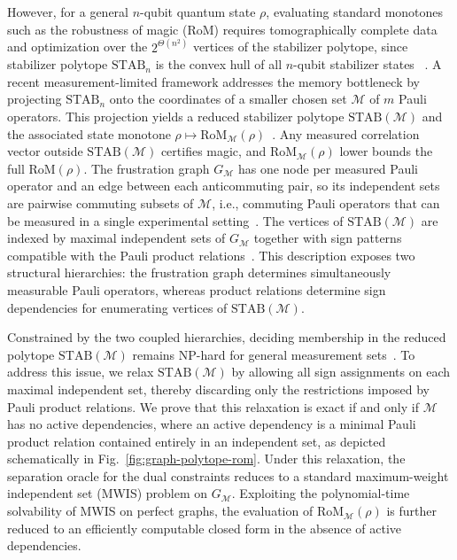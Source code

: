 \documentclass[10pt,aps,pra,twocolumn,floatfix,nofootinbib,superscriptaddress,longbibliography]{revtex4-2}
\newcommand{\Mcal}{\mathcal M}
\newcommand{\STAB}{\mathrm{STAB}}
\newcommand{\RoM}{\mathrm{RoM}}
\begin{document}
	However, for a general $n$-qubit quantum state $\rho$, evaluating standard monotones such as the robustness of magic (RoM) requires tomographically complete data and optimization over the $2^{\Theta(n^2)}$ vertices of the stabilizer polytope, since stabilizer polytope $\STAB_n$ is the convex hull of all $n$-qubit stabilizer states ~\cite{Veitch2014,garcia2017geometry,heinrich2019robustness,hamaguchi2024handbook,oliveirajunior2025geometric,leone2026unbearablehardnessdecidingmagic}.
	A recent measurement-limited framework addresses the memory bottleneck by projecting $\STAB_n$ onto the coordinates of a smaller chosen set $\Mcal$ of $m$ Pauli operators.
	This projection yields a reduced stabilizer polytope $\STAB(\Mcal)$ and the associated state monotone $\rho\mapsto\RoM_\Mcal(\rho)$~\cite{varela2026predictingmagicmeasurements}.
	Any measured correlation vector outside $\STAB(\Mcal)$ certifies magic, and $\RoM_\Mcal(\rho)$ lower bounds the full $\RoM(\rho)$.
	The frustration graph $G_\Mcal$ has one node per measured Pauli operator and an edge between each anticommuting pair, so its independent sets are pairwise commuting subsets of $\Mcal$, i.e., commuting Pauli operators that can be measured in a single experimental setting~\cite{chapman2020characterization}.
	The vertices of $\STAB(\Mcal)$ are indexed by maximal independent sets of $G_\Mcal$ together with sign patterns compatible with the Pauli product relations~\cite{cabello2014graph,chapman2020characterization,xu2024bounding,varela2026predictingmagicmeasurements}.
	This description exposes two structural hierarchies: the frustration graph determines simultaneously measurable Pauli operators, whereas product relations determine sign dependencies for enumerating vertices of $\STAB(\Mcal)$.
	
	Constrained by the two coupled hierarchies, deciding membership in the reduced polytope $\STAB(\Mcal)$ remains NP-hard for general measurement sets~\cite{varela2026predictingmagicmeasurements}.
	To address this issue, we relax $\STAB(\Mcal)$ by allowing all sign assignments on each maximal independent set, thereby discarding only the restrictions imposed by Pauli product relations.
	We prove that this relaxation is exact if and only if $\Mcal$ has no active dependencies, where an active dependency is a minimal Pauli product relation contained entirely in an independent set, as depicted schematically in Fig.~\ref{fig:graph-polytope-rom}.
	Under this relaxation, the separation oracle for the dual constraints reduces to a standard maximum-weight independent set (MWIS) problem on $G_\Mcal$.
	Exploiting the polynomial-time solvability of MWIS on perfect graphs, the evaluation of $\RoM_\Mcal(\rho)$ is further reduced to an efficiently computable closed form in the absence of active dependencies.
	
\end{document}
